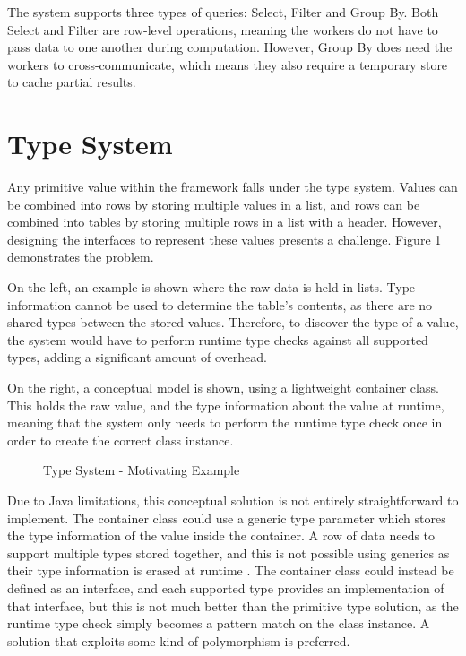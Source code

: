 The system supports three types of queries: Select, Filter and Group By. Both Select and Filter are row-level operations, meaning the workers do not have to pass data to one another during computation. However, Group By does need the workers to cross-communicate, which means they also require a temporary store to cache partial results.

\section{Type System}
Any primitive value within the framework falls under the type system. Values can be combined into rows by storing multiple values in a list, and rows can be combined into tables by storing multiple rows in a list with a header. However, designing the interfaces to represent these values presents a challenge. Figure \ref{fig:type-system-motivation} demonstrates the problem. 

On the left, an example is shown where the raw data is held in lists. Type information cannot be used to determine the table's contents, as there are no shared types between the stored values. Therefore, to discover the type of a value, the system would have to perform runtime type checks against all supported types, adding a significant amount of overhead. 

On the right, a conceptual model is shown, using a lightweight container class. This holds the raw value, and the type information about the value at runtime, meaning that the system only needs to perform the runtime type check once in order to create the correct class instance. 

\begin{figure}[h]
	\centering
	\caption{Type System - Motivating Example}
	\label{fig:type-system-motivation}
\end{figure}

Due to Java limitations, this conceptual solution is not entirely straightforward to implement. The container class could use a generic type parameter which stores the type information of the value inside the container. A row of data needs to support multiple types stored together, and this is not possible using generics as their type information is erased at runtime \cite{ghosh2004generics}. The container class could instead be defined as an interface, and each supported type provides an implementation of that interface, but this is not much better than the primitive type solution, as the runtime type check simply becomes a pattern match on the class instance. A solution that exploits some kind of polymorphism is preferred.

